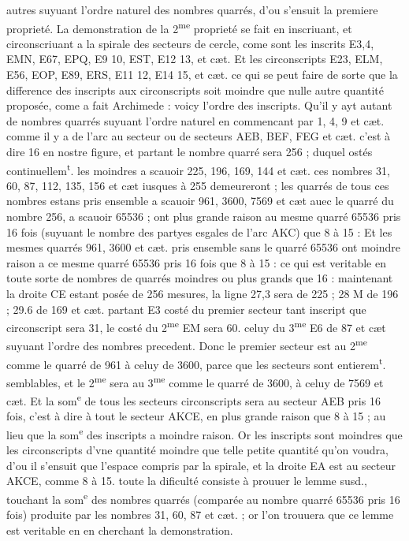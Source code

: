 \documentclass[11pt,a4paper]{article}
\begin{document}
autres suyuant l'ordre naturel des nombres quarrés, d'ou s'ensuit la premiere proprieté. La demonstration de la 2\textsuperscript{me} proprieté se fait en inscriuant, et circonscriuant a la spirale des secteurs de cercle, come sont les inscrits E3,4, EMN, E67, EPQ, E9 10, EST, E12 13, et cæt. Et les circonscripts E23, ELM, E56, EOP, E89, ERS, E11 12, E14 15, et cæt. ce qui se peut faire de sorte que la difference des inscripts aux circonscripts soit moindre que nulle autre quantité proposée, come a fait Archimede : voicy l'ordre des inscripts. Qu'il y ayt autant de nombres quarrés suyuant l'ordre naturel en commencant par 1, 4, 9 et cæt. comme il y a de l'arc  au secteur ou de secteurs AEB, BEF, FEG et cæt. c'est à dire 16 en nostre figure, et partant le nombre quarré sera 256 ; duquel ostés continuellem\textsuperscript{t}. les moindres a scauoir 225, 196, 169, 144 et cæt. ces nombres 31, 60, 87, 112, 135, 156 et cæt iusques à 255 demeureront ; les quarrés de tous ces nombres estans pris ensemble a scauoir 961, 3600, 7569 et cæt auec le quarré du nombre 256, a scauoir 65536 ; ont plus grande raison au mesme quarré 65536 pris 16 fois (suyuant le nombre des partyes esgales de l'arc AKC) que 8 à 15 : Et les mesmes quarrés 961, 3600 et cæt. pris ensemble sans le  quarré 65536 ont moindre raison a ce mesme quarré 65536 pris 16 fois que 8 à 15 : ce qui est veritable en toute sorte de nombres de quarrés moindres ou plus grands que 16 : maintenant la droite CE estant posée de 256 mesures, la ligne 27,3 sera de 225 ; 28 M de 196 ; 29.6 de 169 et cæt. partant E3 costé du premier secteur tant inscript que circonscript sera 31, le costé du 2\textsuperscript{me} EM sera 60. celuy du 3\textsuperscript{me} E6 de 87 et cæt suyuant l'ordre des nombres precedent. Donc le premier secteur est au 2\textsuperscript{me} comme le quarré de 961 à celuy de 3600, parce que les secteurs sont entierem\textsuperscript{t}. semblables, et le 2\textsuperscript{me} sera au 3\textsuperscript{me} comme le quarré de 3600, à celuy de 7569 et cæt. Et la som\textsuperscript{e} de tous les secteurs circonscripts sera au secteur AEB pris 16 fois, c'est à dire à tout le secteur AKCE, en plus grande raison que 8 à \struck{\ill{}} 15 ; au lieu que la som\textsuperscript{e} des inscripts a moindre raison. Or les inscripts sont moindres que les circonscripts d'vne quantité moindre que telle petite quantité qu'on voudra, d'ou il s'ensuit que l'espace compris par la spirale, et la droite EA est au secteur AKCE, comme 8 à 15. toute la dificulté consiste à prouuer le lemme susd., touchant la som\textsuperscript{e} des nombres quarrés (comparée au nombre quarré 65536 pris 16 fois) produite par les nombres 31, 60, 87 et cæt. ; or l'on trouuera que ce lemme est veritable en en cherchant la demonstration.
\end{document}
